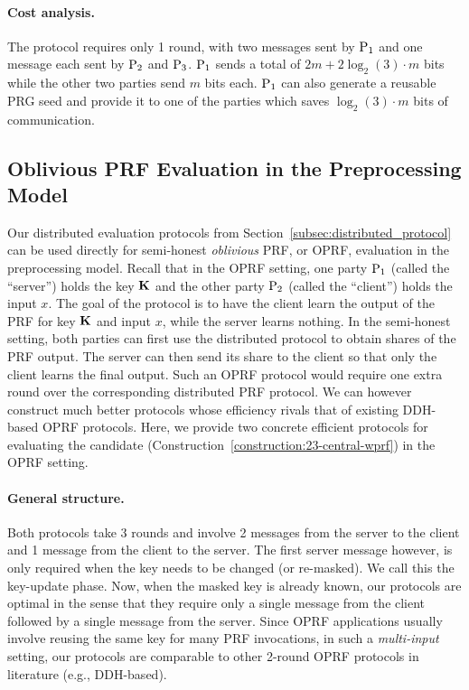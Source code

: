 \paragraph{Cost analysis.}
The protocol requires only 1 round, with two messages sent by $\textnormal{P}_1$ and one message each sent by $\textnormal{P}_2$ and $\textnormal{P}_3$. $\textnormal{P}_1$ sends a total of $2m + 2 \log_2(3)\cdot m$ bits while the other two parties send $m$ bits each. $\textnormal{P}_1$ can also generate a reusable PRG seed and provide it to one of the parties which saves $\log_2(3)\cdot m$ bits of communication.  





\subsection{Oblivious PRF Evaluation in the Preprocessing Model}
\label{subsec:oprf_protocol}
Our distributed evaluation protocols from Section~\ref{subsec:distributed_protocol} can be used directly for semi-honest \textit{oblivious} PRF, or OPRF, evaluation in the preprocessing model. Recall that in the OPRF setting, one party $\textnormal{P}_1$ (called the ``server'') holds the key $\mat{K}$ and the other party $\textnormal{P}_2$ (called the ``client'') holds the input $x$. The goal of the protocol is to have the client learn the output of the PRF for key $\mat{K}$ and input $x$, while the server learns nothing. In the semi-honest setting, both parties can first use the distributed protocol to obtain shares of the PRF output. The server can then send its share to the client so that only the client learns the final output. Such an OPRF protocol would require one extra round over the corresponding distributed PRF protocol. We can however construct much better protocols whose efficiency rivals that of existing DDH-based OPRF protocols. Here, we provide two concrete efficient protocols for evaluating the \ttwPRF candidate (Construction~\ref{construction:23-central-wprf}) in the OPRF setting. 

\paragraph{General structure.} Both protocols take $3$ rounds and involve 2 messages from the server to the client and 1 message from the client to the server. The first server message however, is only required when the key needs to be changed (or re-masked). We call this the key-update phase. Now, when the masked key is already known, our protocols are optimal in the sense that they require only a single message from the client followed by a single message from the server. Since OPRF applications usually involve reusing the same key for many PRF invocations, in such a \textit{multi-input} setting, our protocols are comparable to other 2-round OPRF protocols in literature (e.g., DDH-based). 

